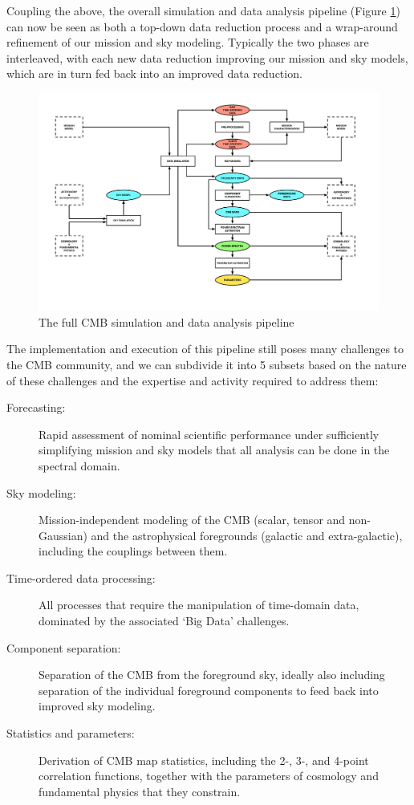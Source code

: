 Coupling the above, the overall simulation and data analysis pipeline (Figure \ref{fig_simda}) can now be seen as both a top-down data reduction process and a wrap-around refinement of our mission and sky modeling. Typically the two phases are interleaved, with each new data reduction improving our mission and sky models, which are in turn fed back into an improved data reduction.

\begin{figure}[htbp]
\includegraphics[width=1\textwidth]{Analysis/simda}
\caption{The full CMB simulation and data analysis pipeline}
\label{fig_simda}
\end{figure}

The implementation and execution of this pipeline still poses many challenges to the CMB community, and we can subdivide it into 5 subsets based on the nature of these challenges and the expertise and activity required to address them:
\vspace*{-0.1in}
\begin{description}
\item[Forecasting:] Rapid assessment of nominal scientific performance under sufficiently simplifying mission and sky models that all analysis can be done in the spectral domain.
\item[Sky modeling:] Mission-independent modeling of the CMB (scalar, tensor and non-Gaussian) and the astrophysical foregrounds (galactic and extra-galactic), including the couplings between them.
\item[Time-ordered data processing:] All processes that require the manipulation of time-domain data, dominated by the associated `Big Data' challenges.
\item[Component separation:] Separation of the CMB from the foreground sky, ideally also including separation of the individual foreground components to feed back into improved sky modeling.
\item[Statistics and parameters:] Derivation of CMB map statistics, including the 2-, 3-, and 4-point correlation functions, together with the parameters of cosmology and fundamental physics that they constrain.
\end{description}

